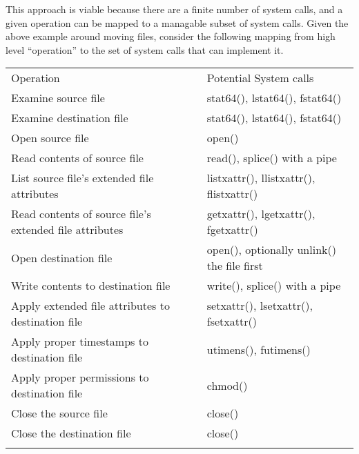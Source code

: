     This approach is viable because there are a finite number of system calls, and a given operation can be mapped to a
    managable subset of system calls.  Given the above example around moving files, consider the following mapping from
    high level ``operation'' to the set of system calls that can implement it.

        \begin{table*}[t]
            \scriptsize{}
            \begin{tabular}{l | l }
            \toprule{}
              Operation                                               & Potential System calls\\
              Examine source file                                     & stat64(), lstat64(), fstat64()\\
              Examine destination file                                & stat64(), lstat64(), fstat64()\\
              Open source file                                        & open()\\
              Read contents of source file                            & read(), splice() with a pipe\\
              List source file's extended file attributes             & listxattr(), llistxattr(), flistxattr()\\
              Read contents of source file's extended file attributes & getxattr(), lgetxattr(), fgetxattr()\\
              Open destination file                                   & open(), optionally unlink() the file first\\
              Write contents to destination file                      & write(), splice() with a pipe\\
              Apply extended file attributes to destination file      & setxattr(), lsetxattr(), fsetxattr()\\
              Apply proper timestamps to destination file             & utimens(), futimens()\\
              Apply proper permissions to destination file            & chmod()\\
              Close the source file                                   & close()\\
              Close the destination file                              & close()\\

              
            \bottomrule{}
            \end{tabular}
        \end{table*}


